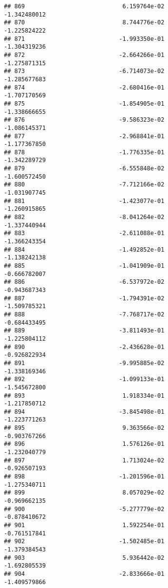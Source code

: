 \documentclass[
]{article}
\begin{document}
\begin{verbatim}
## 869                            6.159764e-02               -1.342480012
## 870                            8.744776e-02               -1.225824222
## 871                           -1.993350e-01               -1.304319236
## 872                           -2.664266e-01               -1.275871315
## 873                           -6.714073e-02               -1.285677683
## 874                           -2.680416e-01               -1.707170569
## 875                           -1.854905e-01               -1.338666655
## 876                           -9.586323e-02               -1.086145371
## 877                           -2.968841e-01               -1.177367850
## 878                           -1.776335e-01               -1.342289729
## 879                           -6.555848e-02               -1.600572450
## 880                           -7.712166e-02               -1.031907745
## 881                           -1.423077e-01               -1.260915865
## 882                           -8.041264e-02               -1.337440944
## 883                           -2.611088e-01               -1.366243354
## 884                           -1.492852e-01               -1.138242138
## 885                           -1.041909e-01               -0.666782007
## 886                           -6.537972e-02               -0.943687343
## 887                           -1.794391e-02               -1.509785321
## 888                           -7.768717e-02               -0.684433495
## 889                           -3.811493e-01               -1.225804112
## 890                           -2.436628e-01               -0.926822934
## 891                           -9.995885e-02               -1.338169346
## 892                           -1.099133e-01               -1.545672800
## 893                            1.918334e-01               -1.217850712
## 894                           -3.845498e-01               -1.223771263
## 895                            9.363566e-02               -0.903767266
## 896                            1.576126e-01               -1.232040779
## 897                            1.713024e-02               -0.926507193
## 898                           -1.201596e-01               -1.275340711
## 899                            8.057029e-02               -0.969662135
## 900                           -5.277779e-02               -0.878410672
## 901                            1.592254e-01               -0.761517841
## 902                           -1.502485e-01               -1.379384543
## 903                            5.936442e-02               -1.692805539
## 904                           -2.833666e-01               -1.409579866

\end{verbatim}
\end{document}
